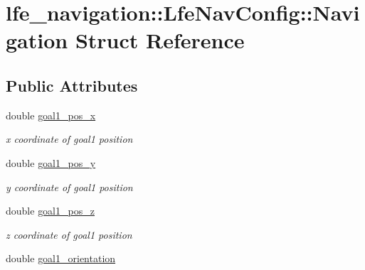 \hypertarget{structlfe__navigation_1_1LfeNavConfig_1_1Navigation}{}\section{lfe\+\_\+navigation\+:\+:Lfe\+Nav\+Config\+:\+:Navigation Struct Reference}
\label{structlfe__navigation_1_1LfeNavConfig_1_1Navigation}
\subsection*{Public Attributes}
\begin{DoxyCompactItemize}
\item 
double \hyperlink{structlfe__navigation_1_1LfeNavConfig_1_1Navigation_abb022bddb3449194fca51d520664bf0e}{goal1\+\_\+pos\+\_\+x}\hypertarget{structlfe__navigation_1_1LfeNavConfig_1_1Navigation_abb022bddb3449194fca51d520664bf0e}{}\label{structlfe__navigation_1_1LfeNavConfig_1_1Navigation_abb022bddb3449194fca51d520664bf0e}

\begin{DoxyCompactList}\small\item\em x coordinate of goal1 position \end{DoxyCompactList}\item 
double \hyperlink{structlfe__navigation_1_1LfeNavConfig_1_1Navigation_a466cfb8a9e82f36785e7309ea1e31829}{goal1\+\_\+pos\+\_\+y}\hypertarget{structlfe__navigation_1_1LfeNavConfig_1_1Navigation_a466cfb8a9e82f36785e7309ea1e31829}{}\label{structlfe__navigation_1_1LfeNavConfig_1_1Navigation_a466cfb8a9e82f36785e7309ea1e31829}

\begin{DoxyCompactList}\small\item\em y coordinate of goal1 position \end{DoxyCompactList}\item 
double \hyperlink{structlfe__navigation_1_1LfeNavConfig_1_1Navigation_ad2a692b49b6ac9e0684f4f146da99779}{goal1\+\_\+pos\+\_\+z}\hypertarget{structlfe__navigation_1_1LfeNavConfig_1_1Navigation_ad2a692b49b6ac9e0684f4f146da99779}{}\label{structlfe__navigation_1_1LfeNavConfig_1_1Navigation_ad2a692b49b6ac9e0684f4f146da99779}

\begin{DoxyCompactList}\small\item\em z coordinate of goal1 position \end{DoxyCompactList}\item 
double \hyperlink{structlfe__navigation_1_1LfeNavConfig_1_1Navigation_a7b7b4ab4f9981d66e81edc07d497ef3e}{goal1\+\_\+orientation}\hypertarget{structlfe__navigation_1_1LfeNavConfig_1_1Navigation_a7b7b4ab4f9981d66e81edc07d497ef3e}{}\label{structlfe__navigation_1_1LfeNavConfig_1_1Navigation_a7b7b4ab4f9981d66e81edc07d497ef3e}


\end{DoxyCompactItemize}
